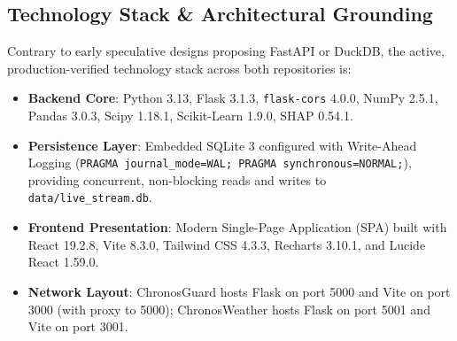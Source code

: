 \documentclass[conference]{IEEEtran}
\begin{document}
\subsection{Technology Stack \& Architectural Grounding}
Contrary to early speculative designs proposing FastAPI or DuckDB, the active, production-verified technology stack across both repositories is:
\begin{itemize}
    \item \textbf{Backend Core}: Python 3.13, Flask 3.1.3, \texttt{flask-cors} 4.0.0, NumPy 2.5.1, Pandas 3.0.3, Scipy 1.18.1, Scikit-Learn 1.9.0, SHAP 0.54.1.
    \item \textbf{Persistence Layer}: Embedded SQLite 3 configured with Write-Ahead Logging (\texttt{PRAGMA journal\_mode=WAL; PRAGMA synchronous=NORMAL;}), providing concurrent, non-blocking reads and writes to \texttt{data/live\_stream.db}.
    \item \textbf{Frontend Presentation}: Modern Single-Page Application (SPA) built with React 19.2.8, Vite 8.3.0, Tailwind CSS 4.3.3, Recharts 3.10.1, and Lucide React 1.59.0.
    \item \textbf{Network Layout}: ChronosGuard hosts Flask on port 5000 and Vite on port 3000 (with proxy to 5000); ChronosWeather hosts Flask on port 5001 and Vite on port 3001.
\end{itemize}
\end{document}
